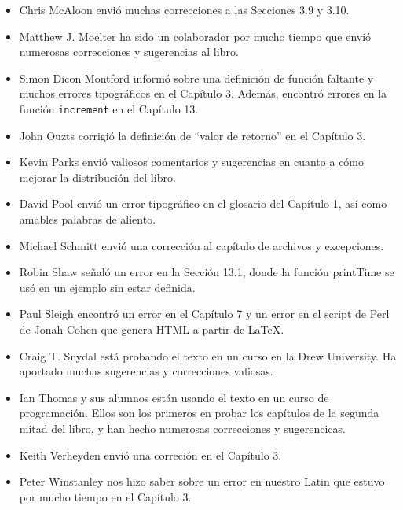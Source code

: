 \documentclass[10pt]{book}
\begin{document}
\begin{itemize}
\item Chris McAloon envió muchas correcciones a las Secciones 3.9 y
3.10.

\item Matthew J. Moelter ha sido un colaborador por mucho tiempo que envió
numerosas correcciones y sugerencias al libro.

\item Simon Dicon Montford informó sobre una definición de función faltante y
muchos errores tipográficos en el Capítulo 3.  Además, encontró errores en la función {\tt increment}
en el Capítulo 13.

\item John Ouzts corrigió la definición de ``valor de retorno''
en el Capítulo 3.

\item Kevin Parks envió valiosos comentarios y sugerencias en cuanto a cómo
mejorar la distribución del libro.

\item David Pool envió un error tipográfico en el glosario del Capítulo 1, así como
amables palabras de aliento.

\item Michael Schmitt envió una corrección al capítulo de archivos
y excepciones.

\item Robin Shaw señaló un error en la Sección 13.1, donde la
función printTime se usó en un ejemplo sin estar definida.

\item Paul Sleigh encontró un error en el Capítulo 7 y un error en el script de Perl
de Jonah Cohen que genera HTML a partir de LaTeX.

\item Craig T. Snydal está probando el texto en un curso en la Drew
University.  Ha aportado muchas sugerencias y correcciones valiosas.

\item Ian Thomas y sus alumnos están usando el texto en un curso de
programación.  Ellos son los primeros en probar los capítulos de la segunda mitad
del libro, y han hecho numerosas correcciones y sugerencicas.

\item Keith Verheyden envió una correción en el Capítulo 3.

\item Peter Winstanley nos hizo saber sobre un error en
nuestro Latin que estuvo por mucho tiempo en el Capítulo 3.


\end{itemize}
\end{document}
